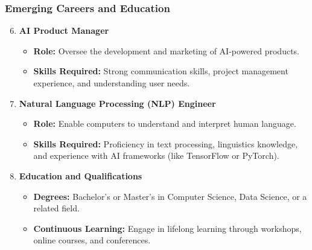 \documentclass[aspectratio=169]{beamer}
\begin{document}
\begin{frame}[fragile]
    \frametitle{Emerging Careers and Education}
    \begin{enumerate}
        \setcounter{enumi}{5} %
        
        \item \textbf{AI Product Manager}
        \begin{itemize}
            \item \textbf{Role:} Oversee the development and marketing of AI-powered products.
            \item \textbf{Skills Required:} Strong communication skills, project management experience, and understanding user needs.
        \end{itemize}

        \item \textbf{Natural Language Processing (NLP) Engineer}
        \begin{itemize}
            \item \textbf{Role:} Enable computers to understand and interpret human language.
            \item \textbf{Skills Required:} Proficiency in text processing, linguistics knowledge, and experience with AI frameworks (like TensorFlow or PyTorch).
        \end{itemize}
        
        \item \textbf{Education and Qualifications}
        \begin{itemize}
            \item \textbf{Degrees:} Bachelor’s or Master’s in Computer Science, Data Science, or a related field.
            \item \textbf{Continuous Learning:} Engage in lifelong learning through workshops, online courses, and conferences.
        \end{itemize}
    \end{enumerate}
\end{frame}
\end{document}
